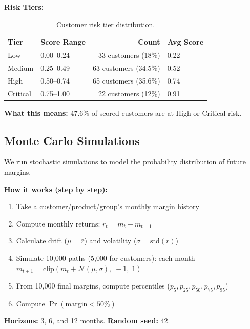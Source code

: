 \documentclass[11pt,a4paper]{article}
\begin{document}
\textbf{Risk Tiers:}
\begin{table}[H]
\centering
\begin{tabular}{llrl}
\toprule
\textbf{Tier} & \textbf{Score Range} & \textbf{Count} & \textbf{Avg Score} \\
\midrule
Low      & 0.00--0.24 & 33 customers (18\%)   & 0.22 \\
Medium   & 0.25--0.49 & 63 customers (34.5\%) & 0.52 \\
High     & 0.50--0.74 & 65 customers (35.6\%) & 0.74 \\
Critical & 0.75--1.00 & 22 customers (12\%)   & 0.91 \\
\bottomrule
\end{tabular}
\caption{Customer risk tier distribution.}
\end{table}

\textbf{What this means:} 47.6\% of scored customers are at High or Critical risk.

\subsection{Monte Carlo Simulations}

We run stochastic simulations to model the probability distribution of future margins.

\textbf{How it works (step by step):}
\begin{enumerate}[nosep]
  \item Take a customer/product/group's monthly margin history
  \item Compute monthly returns: $r_t = m_t - m_{t-1}$
  \item Calculate drift ($\mu = \bar{r}$) and volatility ($\sigma = \text{std}(r)$)
  \item Simulate 10{,}000 paths (5{,}000 for customers): each month $m_{t+1} = \text{clip}(m_t + \mathcal{N}(\mu, \sigma),\; -1,\; 1)$
  \item From 10{,}000 final margins, compute percentiles ($p_5, p_{25}, p_{50}, p_{75}, p_{95}$)
  \item Compute $\Pr(\text{margin} < 50\%)$
\end{enumerate}

\textbf{Horizons:} 3, 6, and 12 months. \textbf{Random seed:} 42.
\end{document}

